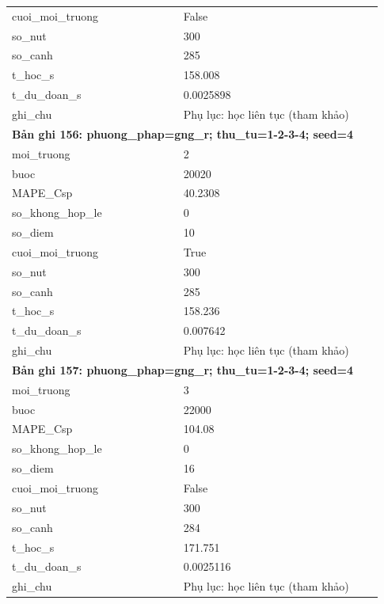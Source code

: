 \begin{longtable}{p{0.43\linewidth}p{0.50\linewidth}}
cuoi\_\allowbreak moi\_\allowbreak truong & False \\
so\_\allowbreak nut & 300 \\
so\_\allowbreak canh & 285 \\
t\_\allowbreak hoc\_\allowbreak s & 158.008 \\
t\_\allowbreak du\_\allowbreak doan\_\allowbreak s & 0.0025898 \\
ghi\_\allowbreak chu & Phụ lục: học liên tục (tham khảo) \\
\midrule
\multicolumn{2}{p{0.95\linewidth}}{\textbf{Bản ghi 156: phuong\_phap=gng\_r; thu\_tu=1-2-3-4; seed=4}} \\
moi\_\allowbreak truong & 2 \\
buoc & 20020 \\
MAPE\_\allowbreak Csp & 40.2308 \\
so\_\allowbreak khong\_\allowbreak hop\_\allowbreak le & 0 \\
so\_\allowbreak diem & 10 \\
cuoi\_\allowbreak moi\_\allowbreak truong & True \\
so\_\allowbreak nut & 300 \\
so\_\allowbreak canh & 285 \\
t\_\allowbreak hoc\_\allowbreak s & 158.236 \\
t\_\allowbreak du\_\allowbreak doan\_\allowbreak s & 0.007642 \\
ghi\_\allowbreak chu & Phụ lục: học liên tục (tham khảo) \\
\midrule
\multicolumn{2}{p{0.95\linewidth}}{\textbf{Bản ghi 157: phuong\_phap=gng\_r; thu\_tu=1-2-3-4; seed=4}} \\
moi\_\allowbreak truong & 3 \\
buoc & 22000 \\
MAPE\_\allowbreak Csp & 104.08 \\
so\_\allowbreak khong\_\allowbreak hop\_\allowbreak le & 0 \\
so\_\allowbreak diem & 16 \\
cuoi\_\allowbreak moi\_\allowbreak truong & False \\
so\_\allowbreak nut & 300 \\
so\_\allowbreak canh & 284 \\
t\_\allowbreak hoc\_\allowbreak s & 171.751 \\
t\_\allowbreak du\_\allowbreak doan\_\allowbreak s & 0.0025116 \\
ghi\_\allowbreak chu & Phụ lục: học liên tục (tham khảo) \\

\end{longtable}
